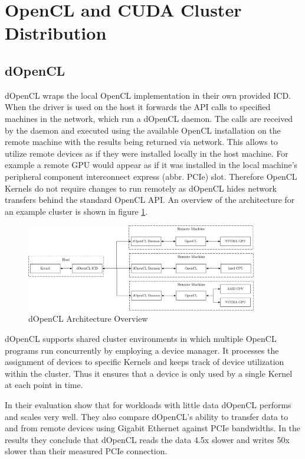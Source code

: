 \section{OpenCL and CUDA Cluster Distribution}
\label{cluster_distribution}
\subsection*{dOpenCL}

dOpenCL wraps the local OpenCL implementation in their own provided ICD. When the driver is used on the host it forwards the API calls to specified machines in the network, which run a dOpenCL daemon\cite{dopencl}. The calls are received by the daemon and executed using the available OpenCL installation on the remote machine with the results being returned via network. This allows to utilize remote devices as if they were installed locally in the host machine. For example a remote GPU would appear as if it was installed in the local machine's peripheral component interconnect express (abbr. PCIe) slot. Therefore OpenCL Kernels do not require changes to run remotely as dOpenCL hides network transfers behind the standard OpenCL API. An overview of the architecture for an example cluster is shown in figure \ref{img:dopencl_arch}.

\begin{figure}[H]
	
	\includegraphics[width=0.9\textwidth]{drawings/dopencl_arch.pdf}
	\centering
	\caption{dOpenCL Architecture Overview}
	\label{img:dopencl_arch}
\end{figure}

dOpenCL supports shared cluster environments in which multiple OpenCL programs run concurrently by employing a device manager. It processes the assignment of devices to specific Kernels and keeps track of device utilization within the cluster. Thus it ensures that a device is only used by a single Kernel at each point in time.

In their evaluation \citeauthor{dopencl} show that for workloads with little data dOpenCL performs and scales very well. They also compare dOpenCL's ability to transfer data to and from remote devices using Gigabit Ethernet against PCIe bandwidths. In the results they conclude that dOpenCL reads the data 4.5x slower and writes 50x slower than their measured PCIe connection.

